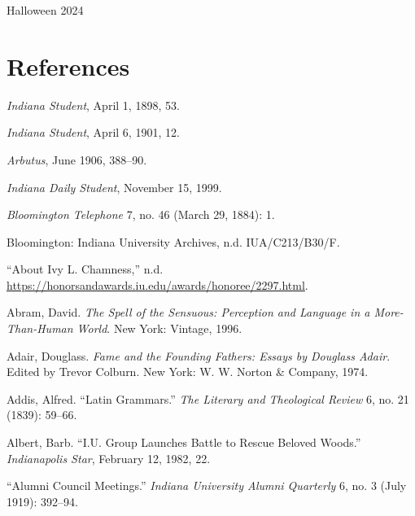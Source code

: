 \documentclass[
  american,
  letterpaper,
]{scrreprt}
\newlength{\cslhangindent}
\newenvironment{CSLReferences}[2] %
 {\begin{list}{}{%
  \setlength{\itemindent}{0pt}
  \setlength{\leftmargin}{0pt}
  \setlength{\parsep}{0pt}
  \ifodd #1
   \setlength{\leftmargin}{\cslhangindent}
   \setlength{\itemindent}{-1\cslhangindent}
  \fi
  \setlength{\itemsep}{#2\baselineskip}}}
 {\end{list}}
\begin{document}
\begin{flushright}
Halloween 2024
\end{flushright}


\chapter*{References}\label{references}


\label{refs}
\begin{CSLReferences}{1}{0}
\emph{Indiana Student}, April 1, 1898, 53.

\emph{Indiana Student}, April 6, 1901, 12.

\emph{Arbutus}, June 1906, 388--90.

\emph{Indiana Daily Student}, November 15, 1999.

\emph{Bloomington Telephone} 7, no. 46 (March 29, 1884): 1.

Bloomington: Indiana University Archives, n.d. IUA/C213/B30/F.

{``{About Ivy L. Chamness},''} n.d.
\url{https://honorsandawards.iu.edu/awards/honoree/2297.html}.

Abram, David. \emph{The Spell of the Sensuous: Perception and Language
in a More-Than-Human World}. New York: Vintage, 1996.

Adair, Douglass. \emph{Fame and the Founding Fathers: Essays by Douglass
Adair}. Edited by Trevor Colburn. New York: W. W. Norton \& Company,
1974.

Addis, Alfred. {``Latin Grammars.''} \emph{The Literary and Theological
Review} 6, no. 21 (1839): 59--66.

Albert, Barb. {``{I.U.} Group Launches Battle to Rescue Beloved
Woods.''} \emph{Indianapolis Star}, February 12, 1982, 22.

{``Alumni Council Meetings.''} \emph{Indiana University Alumni
Quarterly} 6, no. 3 (July 1919): 392--94.


\end{CSLReferences}
\end{document}
